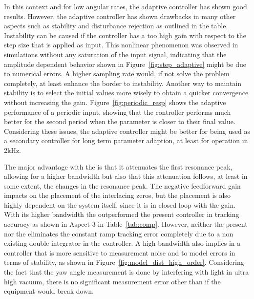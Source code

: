 In this context and for low angular rates, the adaptive controller has shown good results. However, the adaptive controller has shown drawbacks in many other aspects such as stability and disturbance rejection as outlined in the table. Instability can be caused if the controller has a too high gain with respect to the step size that is applied as input. This nonlinear phenomenon was observed in simulations without any saturation of the input signal, indicating that the amplitude dependent behavior shown in Figure~\ref{fig:step_adaptive} might be due to numerical errors. A higher sampling rate would, if not solve the problem completely, at least enhance the border to instability. Another way to maintain stability is to select the initial values more wisely to obtain a quicker convergence without increasing the gain. Figure~\ref{fig:periodic_resp} shows the adaptive performance of a periodic input, showing that the controller performs much better for the second period when the parameter is closer to their final value. Considering these issues, the adaptive controller might be better for being used as a secondary controller for long term parameter adaption, at least for operation in 2kHz.

The major advantage with the \abbrIRC is that it attenuates the first resonance peak, allowing for a higher bandwidth but also that this attenuation follows, at least in some extent, the changes in the resonance peak. The negative feedforward gain impacts on the placement of the interlacing zeros, but the placement is also highly dependent on the system itself, since it is in closed loop with the gain. With its higher bandwidth the \abbrIRC outperformed the present controller in tracking accuracy as shown in Aspect 3 in Table~\ref{tab:comp}. However, neither the present nor the \abbrIRC eliminates the constant ramp tracking error completely due to a non existing double integrator in the controller. A high bandwidth also implies in a controller that is more sensitive to measurement noise and to model errors in terms of stability, as shown in Figure~\ref{fig:model_dist_high_order}. Considering the fact that the yaw angle measurement is done by interfering with light in ultra high vacuum, there is no significant measurement error other than if the equipment would break down.

